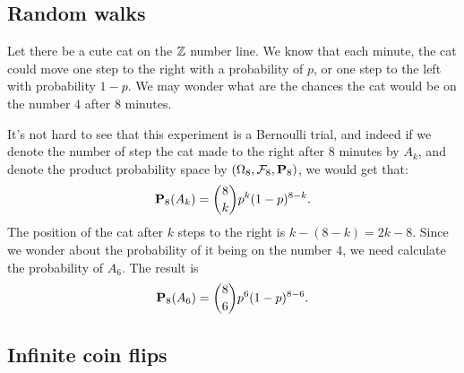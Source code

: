 \documentclass[11pt,a4paper]{article}
\begin{document}
\subsection{Random walks}
\label{ssec:random-walks}
\begin{example}
  Let there be a cute cat on the $\mathbb{Z}$ number line. 
  We know that each minute, the cat could move one step to the right with
  a probability of $p$, or one step to the left with probability $1-p$.
  We may wonder what are the chances the cat would be on the number $4$
  after $8$ minutes.

  It's not hard to see that this experiment is a Bernoulli trial,
  and indeed if we denote the number of step the cat
  made to the right after $8$ minutes by $A_k$,
  and denote the
  product probability space by $(\Omega_8, \mathcal F_8, \mathbf{P}_8)$,
  we would get that:
  \[
    \mathbf{P}_8(A_k) = \binom{8}{k} p^k (1-p)^{8-k}.
  \]
  The position of the cat after $k$ steps to the right is
  $k - (8 - k) = 2k - 8$. 
  Since we wonder about the probability of it being on the number $4$,
  we need calculate the probability of $A_6$.
  The result is
  \[
    \mathbf{P}_{8}(A_{6}) = {\binom{8}{6}} p^{6} (1-p)^{8-6}.
  \]
\end{example}

\subsection{Infinite coin flips}
\end{document}
